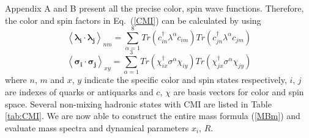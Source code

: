 \documentclass[prd,twocolumn,floatfix,nofootinbib]{revtex4}
\begin{document}
Appendix A and B present all the precise color, spin wave functions. Therefore, the color and spin factors in Eq.~(\ref{CMI}) can be calculated by using
\begin{equation}\label{colorfc}
    {\left\langle \boldsymbol{\lambda_{i}}\cdot \boldsymbol{\lambda_{j}} \right\rangle}_{nm}=
    \sum_{\alpha=1}^{8} Tr\left(c_{in}^{\dagger}\lambda^{\alpha}c_{im}\right) Tr\left(c_{jn}^{\dagger}\lambda^{\alpha}c_{jm}\right)
\end{equation}
\begin{equation}\label{spinfc}
    {\left\langle \boldsymbol{\sigma_{i}}\cdot \boldsymbol{\sigma_{j}} \right\rangle}_{xy}=
    \sum_{\alpha=1}^{3} Tr\left(\chi_{ix}^{\dagger}\sigma^{\alpha}\chi_{iy}\right) Tr\left(\chi_{jx}^{\dagger}\sigma^{\alpha}\chi_{jy}\right)
\end{equation}
where $n$, $m$ and $x$, $y$ indicate the specific color and spin states respectively, $i$, $j$ are indexes of quarks or antiquarks and $c$, $\chi$ are basis vectors for color and spin space.
Several non-mixing hadronic states with CMI are listed in Table \ref{tab:CMI}.
We are now able to construct the entire mass formula (\ref{MBm}) and evaluate mass spectra and dynamical parameters $x_{i}$, $R$.
\end{document}
